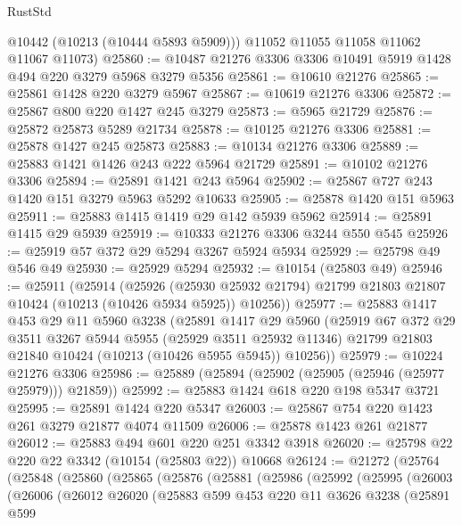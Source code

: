 \begin{lexlean}{RustStd}
\begin{coremodule}
        @10442
        (@10213 (@10444 @5893 @5909)))
      @11052
      @11055
      @11058
      @11062
      @11067
      @11073)
@25860 := @10487 @21276 @3306 @3306 @10491 @5919 @1428 @494 @220 @3279 @5968 @3279 @5356
@25861 := @10610 @21276
@25865 := @25861 @1428 @220 @3279 @5967
@25867 := @10619 @21276 @3306
@25872 := @25867 @800 @220 @1427 @245 @3279
@25873 := @5965 @21729
@25876 := @25872 @25873 @5289 @21734
@25878 := @10125 @21276 @3306
@25881 := @25878 @1427 @245 @25873
@25883 := @10134 @21276 @3306
@25889 := @25883 @1421 @1426 @243 @222 @5964 @21729
@25891 := @10102 @21276 @3306
@25894 := @25891 @1421 @243 @5964
@25902 := @25867 @727 @243 @1420 @151 @3279 @5963 @5292 @10633
@25905 := @25878 @1420 @151 @5963
@25911 := @25883 @1415 @1419 @29 @142 @5939 @5962
@25914 := @25891 @1415 @29 @5939
@25919 := @10333 @21276 @3306 @3244 @550 @545
@25926 := @25919 @57 @372 @29 @5294 @3267 @5924 @5934
@25929 := @25798 @49 @546 @49
@25930 := @25929 @5294
@25932 := @10154 (@25803 @49)
@25946 := @25911
    (@25914
      (@25926
        (@25930 @25932 @21794)
        @21799
        @21803
        @21807
        @10424
        (@10213 (@10426 @5934 @5925))
        @10256))
@25977 := @25883
    @1417
    @453
    @29
    @11
    @5960
    @3238
    (@25891
      @1417
      @29
      @5960
      (@25919
        @67
        @372
        @29
        @3511
        @3267
        @5944
        @5955
        (@25929 @3511 @25932 @11346)
        @21799
        @21803
        @21840
        @10424
        (@10213 (@10426 @5955 @5945))
        @10256))
@25979 := @10224 @21276 @3306
@25986 := @25889 (@25894 (@25902 (@25905 (@25946 (@25977 @25979))) @21859))
@25992 := @25883 @1424 @618 @220 @198 @5347 @3721
@25995 := @25891 @1424 @220 @5347
@26003 := @25867 @754 @220 @1423 @261 @3279 @21877 @4074 @11509
@26006 := @25878 @1423 @261 @21877
@26012 := @25883 @494 @601 @220 @251 @3342 @3918
@26020 := @25798 @22 @220 @22 @3342 (@10154 (@25803 @22)) @10668
@26124 := @21272
    (@25764
      (@25848
        (@25860
          (@25865
            (@25876
              (@25881
                (@25986
                  (@25992
                    (@25995
                      (@26003
                        (@26006
                          (@26012
                            @26020
                            (@25883
                              @599
                              @453
                              @220
                              @11
                              @3626
                              @3238
                              (@25891
                                @599

\end{coremodule}
\end{lexlean}

